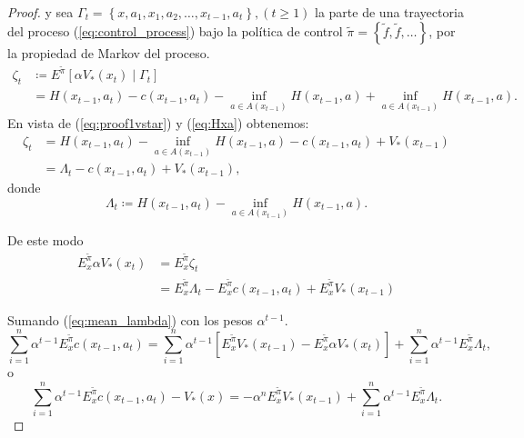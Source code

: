 \documentclass[11pt, spanish]{amsart}
\begin{document}
\begin{proof}
y sea $\Gamma_{t}=\left\{ x,a_{1},x_{1},a_{2},\ldots,x_{t-1},a_{t}\right\} ,\left(t\geq1\right)$
la parte de una trayectoria del proceso (\ref{eq:control_process})
bajo la política de control $\widetilde{\pi}=\left\{ \widetilde{f},\widetilde{f},\ldots\right\} $,
por la propiedad de Markov del proceso. 
\begin{align*}
\zeta_{t} & \coloneqq E^{\widetilde{\pi}}\left[\alpha V_{*}\left(x_{t}\right)\mid\Gamma_{t}\right]\\
 & =H\left(x_{t-1},a_{t}\right)-c\left(x_{t-1},a_{t}\right)-\inf_{a\in A\left(x_{t-1}\right)}H\left(x_{t-1},a\right)+\inf_{a\in A\left(x_{t-1}\right)}H\left(x_{t-1},a\right).
\end{align*}
En vista de (\ref{eq:proof1vstar}) y (\ref{eq:Hxa}) obtenemos: 
\begin{align*}
\zeta_{t} & =H\left(x_{t-1},a_{t}\right)-\inf_{a\in A\left(x_{t-1}\right)}H\left(x_{t-1},a\right)-c\left(x_{t-1},a_{t}\right)+V_{*}\left(x_{t-1}\right)\\
 & =\Lambda_{t}-c\left(x_{t-1},a_{t}\right)+V_{*}\left(x_{t-1}\right),
\end{align*}
donde 
\begin{equation}
\Lambda_{t}\coloneqq H\left(x_{t-1},a_{t}\right)-\inf_{a\in A\left(x_{t-1}\right)}H\left(x_{t-1},a\right).\label{eq:Lambda_t}
\end{equation}

De este modo 
\begin{align}
E_{x}^{\widetilde{\pi}}\alpha V_{*}\left(x_{t}\right) & =E_{x}^{\widetilde{\pi}}\zeta_{t}\nonumber \\
 & =E_{x}^{\widetilde{\pi}}\Lambda_{t}-E_{x}^{\widetilde{\pi}}c\left(x_{t-1},a_{t}\right)+E_{x}^{\widetilde{\pi}}V_{*}\left(x_{t-1}\right)\label{eq:mean_lambda}
\end{align}

Sumando (\ref{eq:mean_lambda}) con los pesos $\alpha^{t-1}$. 
\[
\sum_{i=1}^{n}\alpha^{t-1}E_{x}^{\widetilde{\pi}}c\left(x_{t-1},a_{t}\right)=\sum_{i=1}^{n}\alpha^{t-1}\left[E_{x}^{\widetilde{\pi}}V_{*}\left(x_{t-1}\right)-E_{x}^{\widetilde{\pi}}\alpha V_{*}\left(x_{t}\right)\right]+\sum_{i=1}^{n}\alpha^{t-1}E_{x}^{\widetilde{\pi}}\Lambda_{t},
\]
 o 
\begin{equation}
\sum_{i=1}^{n}\alpha^{t-1}E_{x}^{\widetilde{\pi}}c\left(x_{t-1},a_{t}\right)-V_{*}\left(x\right)=-\alpha^{n}E_{x}^{\widetilde{\pi}}V_{*}\left(x_{t-1}\right)+\sum_{i=1}^{n}\alpha^{t-1}E_{x}^{\widetilde{\pi}}\Lambda_{t}.\label{eq:sum_or_sum}
\end{equation}


\end{proof}
\end{document}
